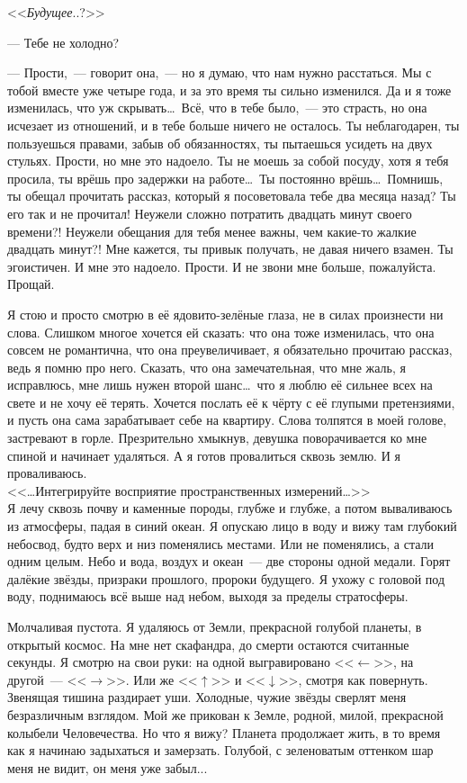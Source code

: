 \documentclass[openany, oneside]{book}
\begin{document}
<<\textit{Будущее}..?>>

--- Тебе не холодно?

--- Прости,~--- говорит она,~--- но я думаю, что нам нужно расстаться. Мы с тобой вместе уже четыре года, и за это время ты сильно изменился. Да и я тоже изменилась, что уж скрывать\dots \ Всё, что в тебе было,~--- это страсть, но она исчезает из отношений, и в тебе больше ничего не осталось. Ты неблагодарен, ты пользуешься правами, забыв об обязанностях, ты пытаешься усидеть на двух стульях. Прости, но мне это надоело. Ты не моешь за собой посуду, хотя я тебя просила, ты врёшь про задержки на работе\dots \ Ты постоянно врёшь\dots \ Помнишь, ты обещал прочитать рассказ, который я посоветовала тебе два месяца назад? Ты его так и не прочитал! Неужели сложно потратить двадцать минут своего времени?! Неужели обещания для тебя менее важны, чем какие-то жалкие двадцать минут?! Мне кажется, ты привык получать, не давая ничего взамен. Ты эгоистичен. И мне это надоело. Прости. И не звони мне больше, пожалуйста. Прощай.

Я стою и просто смотрю в её ядовито-зелёные глаза, не в силах произнести ни слова. Слишком многое хочется ей сказать: что она тоже изменилась, что она совсем не романтична, что она преувеличивает, я обязательно прочитаю рассказ, ведь я помню про него. Сказать, что она замечательная, что мне жаль, я исправлюсь, мне лишь нужен второй шанс\dots \ что я люблю её сильнее всех на свете и не хочу её терять. Хочется послать её к чёрту с её глупыми претензиями, и пусть она сама зарабатывает себе на квартиру. Слова толпятся в моей голове, застревают в горле. Презрительно хмыкнув, девушка поворачивается ко мне спиной и начинает удаляться. А я готов провалиться сквозь землю. И я проваливаюсь.\\

<<\dots Интегрируйте восприятие пространственных измерений\dots>>\\

Я лечу сквозь почву и каменные породы, глубже и глубже, а потом вываливаюсь из атмосферы, падая в синий океан. Я опускаю лицо в воду и вижу там глубокий небосвод, будто верх и низ поменялись местами. Или не поменялись, а стали одним целым. Небо и вода, воздух и океан~--- две стороны одной медали. Горят далёкие звёзды, призраки прошлого, пророки будущего. Я ухожу с головой под воду, поднимаюсь всё выше над небом, выходя за пределы стратосферы.

Молчаливая пустота. Я удаляюсь от Земли, прекрасной голубой планеты, в открытый космос. На мне нет скафандра, до смерти остаются считанные секунды. Я смотрю на свои руки: на одной выгравировано <<$\leftarrow$>>, на другой~--- <<$\rightarrow$>>. Или же <<$\uparrow$>> и <<$\downarrow$>>, смотря как повернуть. Звенящая тишина раздирает уши. Холодные, чужие звёзды сверлят меня безразличным взглядом. Мой же прикован к Земле, родной, милой, прекрасной колыбели Человечества. Но что я вижу? Планета продолжает жить, в то время как я начинаю задыхаться и замерзать. Голубой, с зеленоватым оттенком шар меня не видит, он меня уже забыл...
\end{document}
